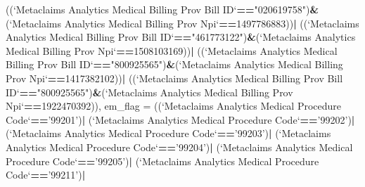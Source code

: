 \documentclass[]{article}
\newenvironment{Shaded}{\begin{snugshade}}{\end{snugshade}}
\newcommand{\DataTypeTok}[1]{\textcolor[rgb]{0.13,0.29,0.53}{#1}}
\newcommand{\DecValTok}[1]{\textcolor[rgb]{0.00,0.00,0.81}{#1}}
\newcommand{\StringTok}[1]{\textcolor[rgb]{0.31,0.60,0.02}{#1}}
\newcommand{\OperatorTok}[1]{\textcolor[rgb]{0.81,0.36,0.00}{\textbf{#1}}}
\newcommand{\NormalTok}[1]{#1}
\begin{document}
\begin{Shaded}
\begin{Highlighting}[]
{\StringTok{                   }\NormalTok{((}\StringTok{`}\DataTypeTok{Metaclaims Analytics Medical Billing Prov Bill ID}\StringTok{`}\OperatorTok{==}\StringTok{"020619758"}\NormalTok{)}\OperatorTok{&}\NormalTok{(}\StringTok{`}\DataTypeTok{Metaclaims Analytics Medical Billing Prov Npi}\StringTok{`}\OperatorTok{==}\DecValTok{1497786883}\NormalTok{))}\OperatorTok{|}
\StringTok{                   }\NormalTok{((}\StringTok{`}\DataTypeTok{Metaclaims Analytics Medical Billing Prov Bill ID}\StringTok{`}\OperatorTok{==}\StringTok{"461773122"}\NormalTok{)}\OperatorTok{&}\NormalTok{(}\StringTok{`}\DataTypeTok{Metaclaims Analytics Medical Billing Prov Npi}\StringTok{`}\OperatorTok{==}\DecValTok{1508103169}\NormalTok{))}\OperatorTok{|}
\StringTok{                   }\NormalTok{((}\StringTok{`}\DataTypeTok{Metaclaims Analytics Medical Billing Prov Bill ID}\StringTok{`}\OperatorTok{==}\StringTok{"800925565"}\NormalTok{)}\OperatorTok{&}\NormalTok{(}\StringTok{`}\DataTypeTok{Metaclaims Analytics Medical Billing Prov Npi}\StringTok{`}\OperatorTok{==}\DecValTok{1417382102}\NormalTok{))}\OperatorTok{|}
\StringTok{                   }\NormalTok{((}\StringTok{`}\DataTypeTok{Metaclaims Analytics Medical Billing Prov Bill ID}\StringTok{`}\OperatorTok{==}\StringTok{"800925565"}\NormalTok{)}\OperatorTok{&}\NormalTok{(}\StringTok{`}\DataTypeTok{Metaclaims Analytics Medical Billing Prov Npi}\StringTok{`}\OperatorTok{==}\DecValTok{1922470392}\NormalTok{)),}
         \DataTypeTok{em_flag =}\NormalTok{ ((}\StringTok{`}\DataTypeTok{Metaclaims Analytics Medical Procedure Code}\StringTok{`}\OperatorTok{==}\StringTok{'99201'}\NormalTok{)}\OperatorTok{|}
\StringTok{                    }\NormalTok{(}\StringTok{`}\DataTypeTok{Metaclaims Analytics Medical Procedure Code}\StringTok{`}\OperatorTok{==}\StringTok{'99202'}\NormalTok{)}\OperatorTok{|}
\StringTok{                    }\NormalTok{(}\StringTok{`}\DataTypeTok{Metaclaims Analytics Medical Procedure Code}\StringTok{`}\OperatorTok{==}\StringTok{'99203'}\NormalTok{)}\OperatorTok{|}
\StringTok{                    }\NormalTok{(}\StringTok{`}\DataTypeTok{Metaclaims Analytics Medical Procedure Code}\StringTok{`}\OperatorTok{==}\StringTok{'99204'}\NormalTok{)}\OperatorTok{|}
\StringTok{                    }\NormalTok{(}\StringTok{`}\DataTypeTok{Metaclaims Analytics Medical Procedure Code}\StringTok{`}\OperatorTok{==}\StringTok{'99205'}\NormalTok{)}\OperatorTok{|}
\StringTok{                    }\NormalTok{(}\StringTok{`}\DataTypeTok{Metaclaims Analytics Medical Procedure Code}\StringTok{`}\OperatorTok{==}\StringTok{'99211'}\NormalTok{)}\OperatorTok{|}
}
\end{Highlighting}
\end{Shaded}
\end{document}
